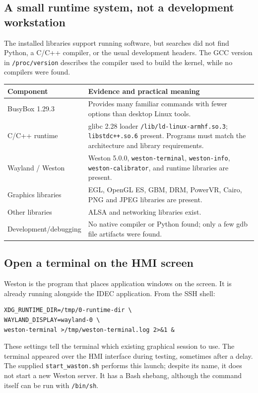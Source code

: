 \documentclass[10pt,letterpaper]{article}
\newcommand{\file}[1]{\nolinkurl{#1}}
\begin{document}
\subsection{A small runtime system, not a development workstation}
The installed libraries support running software, but searches did not find
Python, a C/C++ compiler, or the usual development headers. The GCC version in
\file{/proc/version} describes the compiler used to build the kernel, while no compilers were found.

\begin{tabularx}{\linewidth}{@{}p{1.65in}Y@{}}
\toprule
Component & Evidence and practical meaning \\
\midrule
BusyBox 1.29.3 & Provides many familiar commands with fewer options than desktop Linux tools. \\
C/C++ runtime & glibc 2.28 loader \file{/lib/ld-linux-armhf.so.3}; \file{libstdc++.so.6} present. Programs must match the architecture and library requirements. \\
Wayland / Weston & Weston 5.0.0, \file{weston-terminal}, \file{weston-info}, \file{weston-calibrator}, and runtime libraries are present. \\
Graphics libraries & EGL, OpenGL ES, GBM, DRM, PowerVR, Cairo, PNG and JPEG libraries are present. \\
Other libraries & ALSA and networking libraries exist. \\
Development/debugging & No native compiler or Python found; only a few gdb file artifacts were found. \\
\bottomrule
\end{tabularx}

\subsection{Open a terminal on the HMI screen}
Weston is the program that places application windows on the screen. It is
already running alongside the IDEC application. From the SSH shell:
\begin{lstlisting}
XDG_RUNTIME_DIR=/tmp/0-runtime-dir \
WAYLAND_DISPLAY=wayland-0 \
weston-terminal >/tmp/weston-terminal.log 2>&1 &
\end{lstlisting}
These settings tell the terminal which existing graphical session to use.
The terminal appeared over the HMI interface during testing, sometimes after
a delay. The supplied \file{start_waston.sh} performs this launch; despite its
name, it does not start a new Weston server. It has a Bash shebang, although
the command itself can be run with \file{/bin/sh}.
\end{document}
